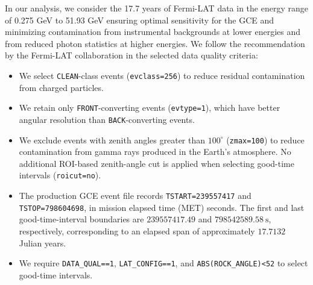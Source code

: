 \documentclass[superscriptaddress,
showpacs,preprintnumbers,nofootinbib,eqsecnum,amsmath,amssymb,aps,11pt, groupedaddress, floatfix]{revtex4-2}
\begin{document}
In our analysis, we consider the 17.7 years of Fermi-LAT data in the energy range of 0.275 GeV to 51.93 GeV ensuring optimal sensitivity for the GCE and minimizing contamination from instrumental backgrounds at lower energies and from reduced photon statistics at higher energies.
We follow the recommendation by the Fermi-LAT collaboration in the selected data quality criteria:
\begin{itemize}
\item We select \texttt{CLEAN}-class events (\texttt{evclass=256}) to reduce residual contamination from charged particles.
\item We retain only \texttt{FRONT}-converting events (\texttt{evtype=1}), which have better angular resolution than \texttt{BACK}-converting events.
\item We exclude events with zenith angles greater than $100^\circ$ (\texttt{zmax=100}) to reduce contamination from gamma rays produced in the Earth's atmosphere. No additional ROI-based zenith-angle cut is applied when selecting good-time intervals (\texttt{roicut=no}).
\item The production GCE event file records \texttt{TSTART=239557417} and
\texttt{TSTOP=798604698}, in mission elapsed time (MET) seconds. The first and last
good-time-interval boundaries are $239557417.49$ and $798542589.58~\mathrm{s}$,
respectively, corresponding to an elapsed span of approximately $17.7132$ Julian years.
\item We require 
\texttt{DATA\_QUAL==1}, \texttt{LAT\_CONFIG==1}, and \texttt{ABS(ROCK\_ANGLE)<52} to select good-time intervals.
\end{itemize}
\end{document}
